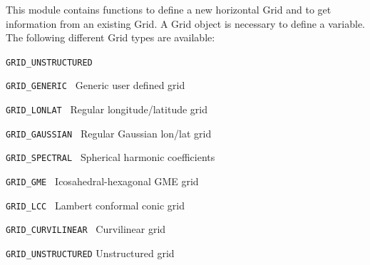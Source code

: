 This module contains functions to define a new horizontal Grid
and to get information from an existing Grid.
A Grid object is necessary to define a variable.
The following different Grid types are available:

\vspace*{3mm}
\hspace*{8mm}\begin{minipage}{15cm}
\begin{deflist}{\large\texttt{GRID\_UNSTRUCTURED \ \ }}
\item[\large\texttt{GRID\_GENERIC     }]  Generic user defined grid      
\item[\large\texttt{GRID\_LONLAT      }]  Regular longitude/latitude grid
\item[\large\texttt{GRID\_GAUSSIAN    }]  Regular Gaussian lon/lat grid
\item[\large\texttt{GRID\_SPECTRAL    }]  Spherical harmonic coefficients
\item[\large\texttt{GRID\_GME         }]  Icosahedral-hexagonal GME grid    
\item[\large\texttt{GRID\_LCC         }]  Lambert conformal conic grid
\item[\large\texttt{GRID\_CURVILINEAR }]  Curvilinear grid
\item[\large\texttt{GRID\_UNSTRUCTURED}]  Unstructured grid
\end{deflist}
\end{minipage}
